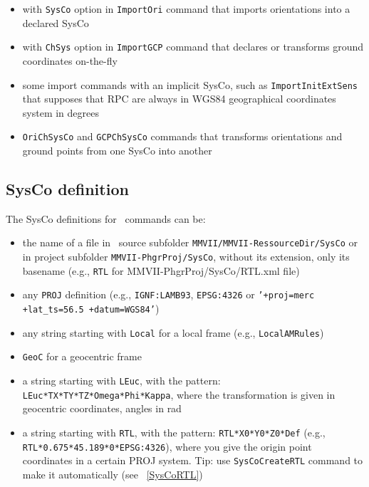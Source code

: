 \begin{itemize}
\item with {\tt SysCo} option in {\tt ImportOri} command that imports orientations into a declared SysCo
\item with {\tt ChSys} option in {\tt ImportGCP} command that declares or transforms ground coordinates on-the-fly
\item some import commands with an implicit SysCo, such as {\tt ImportInitExtSens} that supposes that RPC are always in WGS84 geographical coordinates system in degrees
\item {\tt OriChSysCo} and {\tt GCPChSysCo} commands that transforms orientations and ground points from one SysCo into another
\end{itemize}

\subsection{SysCo definition}
The SysCo definitions for \CdPPP\ commands can be:
\begin{itemize}
\item the name of a file in \CdPPP\ source subfolder {\tt MMVII/MMVII-RessourceDir/SysCo} or in project subfolder {\tt MMVII-PhgrProj/SysCo}, without its extension, only its basename (e.g., {\tt RTL} for MMVII-PhgrProj/SysCo/RTL.xml file)
\item any {\tt PROJ} definition (e.g., {\tt IGNF:LAMB93}, {\tt EPSG:4326} or {\tt '+proj=merc +lat\_ts=56.5 +datum=WGS84'})
\item any string starting with {\tt Local} for a local frame (e.g., {\tt LocalAMRules})
\item {\tt GeoC} for a geocentric frame
\item a string starting with {\tt LEuc}, with the pattern: {\tt LEuc*TX*TY*TZ*Omega*Phi*Kappa}, where the transformation is given in geocentric coordinates, angles in rad
\item a string starting with {\tt RTL}, with the pattern: {\tt RTL*X0*Y0*Z0*Def} (e.g., {\tt RTL*0.675*45.189*0*EPSG:4326}),
where you give the origin point coordinates in a certain PROJ system. Tip: use {\tt SysCoCreateRTL} command to make it automatically (see ~\ref{SysCoRTL})

\end{itemize}


